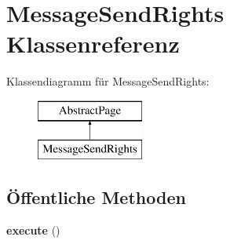 \hypertarget{class_message_send_rights}{}\section{Message\+Send\+Rights Klassenreferenz}
\label{class_message_send_rights}
Klassendiagramm für Message\+Send\+Rights\+:\begin{figure}[H]
\begin{center}
\leavevmode
\includegraphics[height=2.000000cm]{class_message_send_rights}
\end{center}
\end{figure}
\subsection*{Öffentliche Methoden}
\begin{DoxyCompactItemize}
\item 
\mbox{\label{class_message_send_rights_a856a4ffb126a3662c63cb63c0ad7fd44}} 
{\bfseries execute} ()
\end{DoxyCompactItemize}
